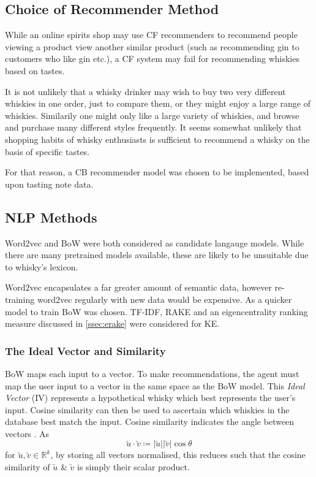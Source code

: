 \subsection{Choice of Recommender Method}
While an online spirits shop may use CF recommenders to recommend people viewing a product view another
similar product (such as recommending gin to customers who like gin etc.), a CF system may fail for
recommending whiskies based on tastes.

It is not unlikely that a whisky drinker may wish to buy two very different whiskies in one order, just 
to compare them, or they might enjoy a large range of whiskies. Similarily one might only like a large
variety of whiskies, and browse and purchase many different styles frequently. 
It seems somewhat unlikely that shopping habits of whisky enthusiasts is sufficient to recommend a whisky
on the basis of specific tastes.

For that reason, a CB recommender model was chosen to be implemented, based upon tasting note data.

\subsection{NLP Methods}\label{whiskylang}
Word2vec and BoW were both considered as candidate langauge models. While there are
many pretrained models available, these are likely to be unsuitable due to whisky's lexicon.

Word2vec encapsulates a far greater amount of semantic data, however re-training
word2vec regularly with new data would be expensive. As a quicker model to train
BoW was chosen.  TF-IDF, RAKE and an eigencentrality ranking measure discussed in 
\autoref{ssec:erake} were considered for KE.

\subsubsection{The Ideal Vector and Similarity}\label{sssec:cossim}
BoW maps each input to a vector. To make recommendations, the agent must
map the user input to a vector in the same space as the BoW model. This
\emph{Ideal Vector} (IV) represents a hypothetical whisky which best represents 
the user's input. Cosine similarity can then be used to ascertain which whiskies in 
the database best match the input.  Cosine similarity indicates the angle between
vectors \cite{Melville2010}. As  
\begin{equation}
    \utilde{u} \cdot \utilde{v} \coloneqq \vert \utilde{u} \vert \vert \utilde{v} \vert \cos{\theta}
\end{equation}
for $\utilde{u}, \utilde{v}\in \mathbb{R} ^{k}$, by storing all vectors normalised, this reduces such
that the cosine similarity of $\utilde{u}$ \& $\utilde{v}$ is simply their scalar product.

